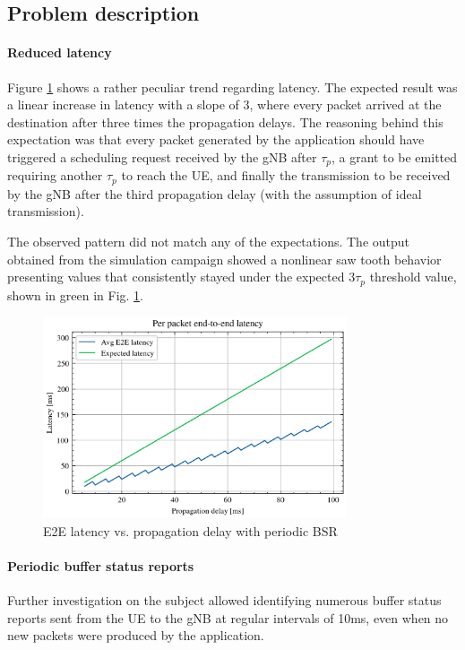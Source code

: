 \subsection{Problem description}

\paragraph{Reduced latency}

Figure \ref{fig:lat-saw} shows a rather peculiar trend regarding latency. The expected result was a linear increase in latency with a slope of 3, where every packet arrived at the destination after three times the propagation delays. The reasoning behind this expectation was that every packet generated by the application should have triggered a scheduling request received by the \ac{gNB} after $\tau_p$, a grant to be emitted requiring another $\tau_p$ to reach the \ac{UE}, and finally the transmission to be received by the \ac{gNB} after the third propagation delay (with the assumption of ideal transmission).

The observed pattern did not match any of the expectations. The output obtained from the simulation campaign showed a nonlinear saw tooth behavior presenting values that consistently stayed under the expected $3\tau_p$ threshold value, shown in green in Fig. \ref{fig:lat-saw}.

\begin{figure}[ht]
    \centering
    \includegraphics[width=0.8\textwidth]{res/lat-udp-saw.png}
    \caption{E2E latency vs. propagation delay with periodic \ac{BSR}}
    \label{fig:lat-saw}
\end{figure}

\paragraph{Periodic buffer status reports} Further investigation on the subject allowed identifying numerous buffer status reports sent from the \ac{UE} to the \ac{gNB} at regular intervals of 10ms, even when no new packets were produced by the application.

